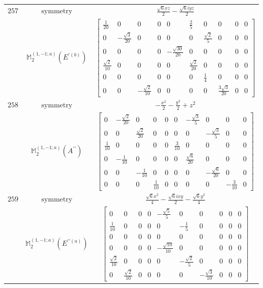 \documentclass[fleqn,8pt,landscape]{jsarticle}
\begin{document}
\begin{longtable}{ccc}
$ 257 $ & $ \text{symmetry} $ & $ \frac{\sqrt{6} x z}{2} - \frac{\sqrt{6} i y z}{2} $ \\
$  $ & $ \mathbb{M}_{2}^{(1,-1;a)}(E^{\prime(b)}) $ & $ \begin{bmatrix} \frac{1}{20} & 0 & 0 & 0 & 0 & \frac{2}{5} & 0 & 0 & 0 & 0 \\ 0 & - \frac{\sqrt{3}}{20} & 0 & 0 & 0 & 0 & \frac{\sqrt{2}}{5} & 0 & 0 & 0 \\ 0 & 0 & 0 & 0 & - \frac{\sqrt{30}}{20} & 0 & 0 & 0 & 0 & 0 \\ \frac{\sqrt{2}}{10} & 0 & 0 & 0 & 0 & \frac{\sqrt{2}}{20} & 0 & 0 & 0 & 0 \\ 0 & 0 & 0 & 0 & 0 & 0 & \frac{1}{4} & 0 & 0 & 0 \\ 0 & 0 & - \frac{\sqrt{2}}{10} & 0 & 0 & 0 & 0 & \frac{3 \sqrt{3}}{20} & 0 & 0 \end{bmatrix} $ \\ \hline
$ 258 $ & $ \text{symmetry} $ & $ - \frac{x^{2}}{2} - \frac{y^{2}}{2} + z^{2} $ \\
$  $ & $ \mathbb{M}_{2}^{(1,-1;a)}(A^{\prime\prime}) $ & $ \begin{bmatrix} 0 & - \frac{\sqrt{2}}{20} & 0 & 0 & 0 & 0 & - \frac{\sqrt{3}}{5} & 0 & 0 & 0 \\ 0 & 0 & \frac{\sqrt{2}}{20} & 0 & 0 & 0 & 0 & - \frac{\sqrt{3}}{5} & 0 & 0 \\ \frac{1}{10} & 0 & 0 & 0 & 0 & \frac{3}{10} & 0 & 0 & 0 & 0 \\ 0 & - \frac{1}{10} & 0 & 0 & 0 & 0 & \frac{\sqrt{6}}{20} & 0 & 0 & 0 \\ 0 & 0 & - \frac{1}{10} & 0 & 0 & 0 & 0 & - \frac{\sqrt{6}}{20} & 0 & 0 \\ 0 & 0 & 0 & \frac{1}{10} & 0 & 0 & 0 & 0 & - \frac{3}{10} & 0 \end{bmatrix} $ \\ \hline
$ 259 $ & $ \text{symmetry} $ & $ \frac{\sqrt{6} x^{2}}{4} - \frac{\sqrt{6} i x y}{2} - \frac{\sqrt{6} y^{2}}{4} $ \\
$  $ & $ \mathbb{M}_{2}^{(1,-1;a)}(E^{\prime\prime(a)}) $ & $ \begin{bmatrix} 0 & 0 & 0 & 0 & - \frac{\sqrt{5}}{5} & 0 & 0 & 0 & 0 & 0 \\ \frac{1}{10} & 0 & 0 & 0 & 0 & - \frac{1}{5} & 0 & 0 & 0 & 0 \\ 0 & 0 & 0 & 0 & 0 & 0 & 0 & 0 & 0 & 0 \\ 0 & 0 & 0 & 0 & - \frac{\sqrt{10}}{10} & 0 & 0 & 0 & 0 & 0 \\ \frac{\sqrt{2}}{10} & 0 & 0 & 0 & 0 & - \frac{\sqrt{2}}{5} & 0 & 0 & 0 & 0 \\ 0 & \frac{\sqrt{2}}{10} & 0 & 0 & 0 & 0 & - \frac{\sqrt{3}}{10} & 0 & 0 & 0 \end{bmatrix} $ \\ \hline

\end{longtable}
\end{document}
